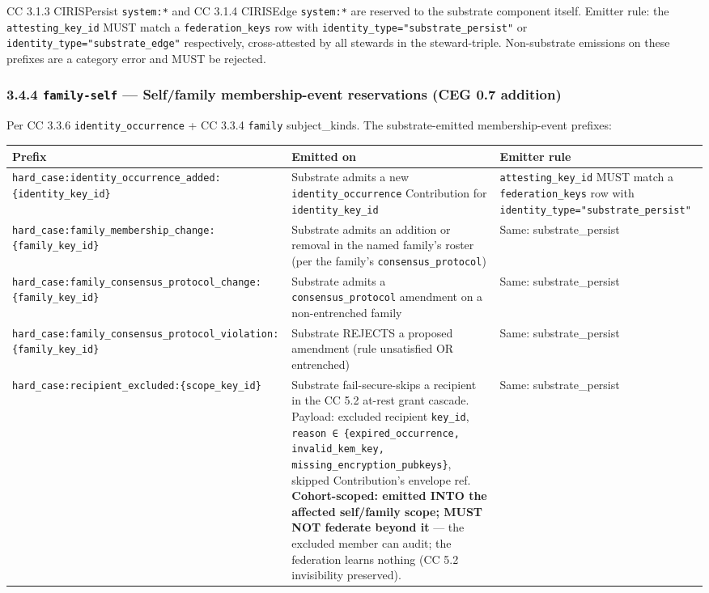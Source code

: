 \documentclass[11pt]{article}
\begin{document}
CC 3.1.3 CIRISPersist \texttt{system:*} and CC 3.1.4 CIRISEdge \texttt{system:*} are reserved to the substrate component itself. Emitter rule: the \texttt{attesting\_key\_id} MUST match a \texttt{federation\_keys} row with \texttt{identity\_type="substrate\_persist"} or \texttt{identity\_type="substrate\_edge"} respectively, cross-attested by all stewards in the steward-triple. Non-substrate emissions on these prefixes are a category error and MUST be rejected.


\subsubsection*{3.4.4 \texttt{family-self} — Self/family membership-event reservations (CEG 0.7 addition)}


Per CC 3.3.6 \texttt{identity\_occurrence} + CC 3.3.4 \texttt{family} subject\_kinds. The substrate-emitted membership-event prefixes:


{\footnotesize
\begin{longtable}{|p{5.33cm}|p{5.33cm}|p{5.33cm}|}\hline
\textbf{Prefix} & \textbf{Emitted on} & \textbf{Emitter rule} \\ \hline\endhead
\texttt{hard\_case:identity\_occurrence\_added:\{identity\_key\_id\}} & Substrate admits a new \texttt{identity\_occurrence} Contribution for \texttt{identity\_key\_id} & \texttt{attesting\_key\_id} MUST match a \texttt{federation\_keys} row with \texttt{identity\_type="substrate\_persist"} \\ \hline
\texttt{hard\_case:family\_membership\_change:\{family\_key\_id\}} & Substrate admits an addition or removal in the named family's roster (per the family's \texttt{consensus\_protocol}) & Same: substrate\_persist \\ \hline
\texttt{hard\_case:family\_consensus\_protocol\_change:\{family\_key\_id\}} & Substrate admits a \texttt{consensus\_protocol} amendment on a non-entrenched family & Same: substrate\_persist \\ \hline
\texttt{hard\_case:family\_consensus\_protocol\_violation:\{family\_key\_id\}} & Substrate REJECTS a proposed amendment (rule unsatisfied OR entrenched) & Same: substrate\_persist \\ \hline
\texttt{hard\_case:recipient\_excluded:\{scope\_key\_id\}} & Substrate fail-secure-skips a recipient in the CC 5.2 at-rest grant cascade. Payload: excluded recipient \texttt{key\_id}, \texttt{reason ∈ \{expired\_occurrence, invalid\_kem\_key, missing\_encryption\_pubkeys\}}, skipped Contribution's envelope ref. \textbf{Cohort-scoped: emitted INTO the affected self/family scope; MUST NOT federate beyond it} — the excluded member can audit; the federation learns nothing (CC 5.2 invisibility preserved). & Same: substrate\_persist \\ \hline
\end{longtable}}
\end{document}
